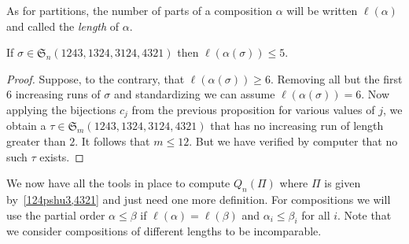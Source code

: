 \documentclass[ALCO,ThmDefs,Unicode,epreuves]{cedram}
\newcommand{\ree}[1]{\eqref{#1}}
\newcommand{\al}{\alpha}
\newcommand{\be}{\beta}
\newcommand{\si}{\sigma}
\newcommand{\fS}{{\mathfrak S}}
\begin{document}
As for partitions, the number of parts of a composition $\al$ will be written $\ell(\al)$ and called the \emph{length} of $\al$. 

\begin{coro}
\label{ell}
If $\si\in\fS_n(1243, 1324, 3124, 4321)$ then $\ell(\al(\si))\le 5$.
\end{coro}
\begin{proof}
Suppose, to the contrary, that $\ell(\al(\si))\ge 6$. Removing all but the first $6$ increasing runs of $\si$ and standardizing we can assume $\ell(\al(\si))= 6$. Now applying the bijections $c_j$ from the previous proposition for various values of $j$, we obtain a $\tau\in\fS_m(1243, 1324, 3124, 4321)$ that has no increasing run of length greater than $2$. It follows that $m\le 12$. But we have verified by computer that no such $\tau$ exists.
\end{proof}

We now have all the tools in place to compute $Q_n(\Pi)$ where $\Pi$ is given by~\ree{124pshu3,4321} and just need one more definition. For compositions we will use the partial order $\al\le\be$ if $\ell(\al)=\ell(\be)$ and $\al_i\le\be_i$ for all $i$. Note that we consider compositions of different lengths to be incomparable.
\end{document}
